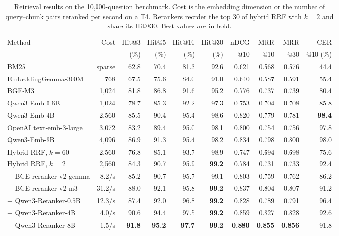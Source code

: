 \begin{table}[tb]
\centering
\caption{Retrieval results on the 10{,}000-question benchmark. Cost is the embedding dimension or the number of query--chunk pairs reranked per second on a T4. Rerankers reorder the top 30 of hybrid RRF with $k=2$ and share its Hit@30. Best values are in bold.}
\label{tab:retrieval}
\scriptsize
\setlength{\tabcolsep}{2.1pt}
\begin{tabular}{lrrrrrrrrr}
\toprule
Method & Cost & Hit@3 & Hit@5 & Hit@10 & Hit@30 & nDCG & MRR & MRR & CER \\
 & & (\%) & (\%) & (\%) & (\%) & @10 & @10 & @30 & @10 (\%) \\
\midrule
BM25 & sparse & 62.8 & 70.4 & 81.3 & 92.6 & 0.621 & 0.568 & 0.576 & 44.4 \\
EmbeddingGemma-300M & 768 & 67.5 & 75.6 & 84.0 & 91.0 & 0.640 & 0.587 & 0.591 & 55.4 \\
BGE-M3 & 1{,}024 & 81.8 & 86.8 & 91.6 & 95.2 & 0.776 & 0.737 & 0.739 & 80.4 \\
Qwen3-Emb-0.6B & 1{,}024 & 78.7 & 85.3 & 92.2 & 97.3 & 0.753 & 0.704 & 0.708 & 85.8 \\
Qwen3-Emb-4B & 2{,}560 & 85.5 & 90.4 & 95.4 & 98.6 & 0.820 & 0.779 & 0.781 & \textbf{98.4} \\
OpenAI text-emb-3-large & 3{,}072 & 83.2 & 89.4 & 95.0 & 98.1 & 0.800 & 0.754 & 0.756 & 97.8 \\
Qwen3-Emb-8B & 4{,}096 & 86.9 & 91.3 & 95.4 & 98.2 & 0.834 & 0.798 & 0.800 & 98.0 \\
\midrule
Hybrid RRF, $k{=}60$ & 2{,}560 & 76.8 & 85.1 & 93.7 & 98.9 & 0.747 & 0.694 & 0.698 & 75.6 \\
Hybrid RRF, $k{=}2$ & 2{,}560 & 84.3 & 90.7 & 95.9 & \textbf{99.2} & 0.784 & 0.731 & 0.733 & 92.4 \\
\midrule
+ BGE-reranker-v2-gemma & 8.2/s & 85.2 & 90.7 & 95.7 & 99.1 & 0.803 & 0.759 & 0.762 & 86.2 \\
+ BGE-reranker-v2-m3 & 31.2/s & 88.0 & 92.1 & 95.8 & \textbf{99.2} & 0.837 & 0.804 & 0.807 & 91.2 \\
+ Qwen3-Reranker-0.6B & 12.3/s & 87.4 & 92.0 & 96.8 & \textbf{99.2} & 0.828 & 0.789 & 0.791 & 96.4 \\
+ Qwen3-Reranker-4B & 4.0/s & 90.6 & 94.4 & 97.5 & \textbf{99.2} & 0.859 & 0.827 & 0.828 & 92.6 \\
+ Qwen3-Reranker-8B & 1.5/s & \textbf{91.8} & \textbf{95.2} & \textbf{97.7} & \textbf{99.2} & \textbf{0.880} & \textbf{0.855} & \textbf{0.856} & 91.8 \\
\bottomrule
\end{tabular}
\end{table}
